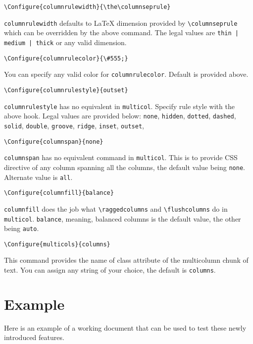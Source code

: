 \documentclass{article}
\begin{document}
\begin{verbatim}
\Configure{columnrulewidth}{\the\columnseprule}
\end{verbatim}
\texttt{columnrulewidth} defaults to \LaTeX{} dimension provided by
\texttt{\textbackslash{}columnseprule} which can be overridden by the
above command. The legal values are \texttt{thin | medium | thick} or
any valid dimension.

\begin{verbatim}
\Configure{columnrulecolor}{\#555;}
\end{verbatim}
You can specify any valid color for \texttt{columnrulecolor}. Default
is provided above.

\begin{verbatim}
\Configure{columnrulestyle}{outset}
\end{verbatim}
\texttt{columnrulestyle} has no equivalent in \texttt{multicol}. Specify rule style
with the above hook. Legal values are provided below:
 \texttt{none}, \texttt{hidden}, \texttt{dotted}, \texttt{dashed}, \texttt{solid}, \texttt{double},  \texttt{groove},
     \texttt{ridge}, \texttt{inset},  \texttt{outset}, 

\begin{verbatim}
\Configure{columnspan}{none}
\end{verbatim}
     \texttt{columnspan} has no equivalent command in
     \texttt{multicol}. This is to provide CSS directive of any column
     spanning all the columns, the default value being
     \texttt{none}. Alternate value is \texttt{all}.

\begin{verbatim}
\Configure{columnfill}{balance}
\end{verbatim}
     \texttt{columnfill} does the job what
     \texttt{\textbackslash{}raggedcolumns} and
     \texttt{\textbackslash{}flushcolumns} do in
     \texttt{multicol}. \texttt{balance}, meaning, balanced columns is
     the default value, the other being \texttt{auto}.

\begin{verbatim}
\Configure{multicols}{columns}
\end{verbatim}
This command provides the name of class attribute of the multicolumn
chunk of text. You can assign any string of your choice, the default
is \texttt{columns}. 
\section*{Example}
\label{sec-4}
Here is an example of a working document that can be used to test
these newly introduced features.
\end{document}
